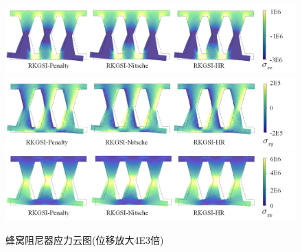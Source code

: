 \begin{figure}[H]
    \centering
        \includegraphics[scale=0.55]{figure/DAMPER/Honeycomb/M11.png}
        \includegraphics[scale=0.55]{figure/DAMPER/Honeycomb/M12.png}
        \includegraphics[scale=0.55]{figure/DAMPER/Honeycomb/M22.png}
    \caption{蜂窝阻尼器应力云图(位移放大4E3倍)}\label{HoneycombM}
\end{figure}
